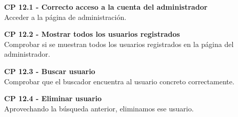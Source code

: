 \textbf{CP 12.1 - Correcto acceso a la cuenta del administrador} \\
Acceder a la página de administración.

\textbf{CP 12.2 - Mostrar todos los usuarios registrados} \\
Comprobar si se muestran todos los usuarios registrados en la página del administrador.

\textbf{CP 12.3 - Buscar usuario} \\
Comprobar que el buscador encuentra al usuario concreto correctamente.

\textbf{CP 12.4 - Eliminar usuario} \\
Aprovechando la búsqueda anterior, eliminamos ese usuario.
